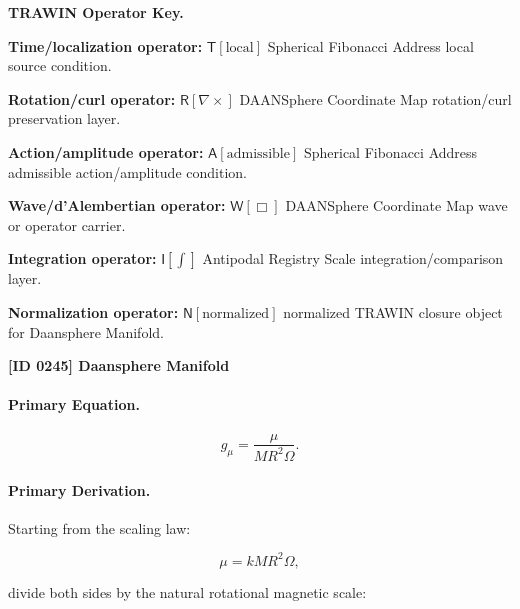 \par\vspace{0.45\baselineskip}
\noindent\begin{minipage}[t]{\linewidth}
\begingroup
\small
\raggedright
\textbf{TRAWIN Operator Key.}\par
\noindent\textbf{Time/localization operator:} $\mathsf{T}\!\left[\mathrm{local}\right]$ Spherical Fibonacci Address local source condition.\par
\noindent\textbf{Rotation/curl operator:} $\mathsf{R}\!\left[\nabla\times\right]$ DAANSphere Coordinate Map rotation/curl preservation layer.\par
\noindent\textbf{Action/amplitude operator:} $\mathsf{A}\!\left[\mathrm{admissible}\right]$ Spherical Fibonacci Address admissible action/amplitude condition.\par
\noindent\textbf{Wave/d'Alembertian operator:} $\mathsf{W}\!\left[\Box\right]$ DAANSphere Coordinate Map wave or operator carrier.\par
\noindent\textbf{Integration operator:} $\mathsf{I}\!\left[\int\right]$ Antipodal Registry Scale integration/comparison layer.\par
\noindent\textbf{Normalization operator:} $\mathsf{N}\!\left[\mathrm{normalized}\right]$ normalized TRAWIN closure object for Daansphere Manifold.\par
\endgroup
\end{minipage}

\clearpage
\noindent\textbf{[ID 0245] Daansphere Manifold}\par
\vspace{0.35em}
\paragraph{Primary Equation.}
\begin{equation}
g_{\mu}
=
\frac{\mu}
{MR^2\Omega}.
\end{equation}

\paragraph{Primary Derivation.}
Starting from the scaling law:

\begin{equation}
\mu
=
kMR^2\Omega ,
\end{equation}

divide both sides by the natural rotational magnetic scale:

